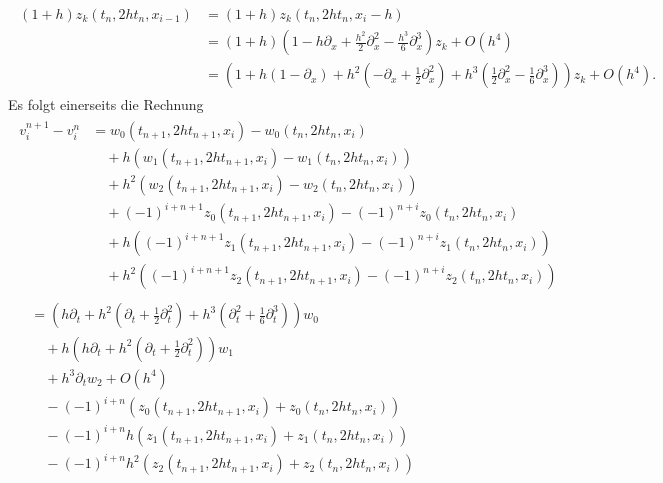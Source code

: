 {\small
\begin{align}
\begin{split}
(1 + h) z_k(t_n, 2 h t_n, x_{i-1}) &= (1+h) z_k(t_n, 2 h t_n, x_i - h)\\
&= (1 + h) \left( 1 - h \partial_x + \frac{h^2}{2} \partial^2_x - \frac {h^3}{6} \partial^3_x \right) z_k + O(h^4)\\
&= \left( 1 + h( 1 - \partial_x ) + h^2  \left( -\partial_x + \frac{1}{2} \partial^2_x \right) + h^3 \left(\frac{1}{2} \partial^2_x - \frac{1}{6} \partial^3_x \right) \right) z_k + O(h^4).
\end{split}
\end{align}
}
Es folgt einerseits die Rechnung
\begin{align}
\begin{split}
v^{n+1}_i - v^n_i &= w_0(t_{n+1}, 2 h t_{n+1}, x_i) - w_0(t_n, 2 h t_n, x_i)\\
&\quad + h \left(  w_1(t_{n+1}, 2 h t_{n+1}, x_i) - w_1(t_n, 2 h t_n, x_i) \right)\\
&\quad + h^2 \left(  w_2(t_{n+1}, 2 h t_{n+1}, x_i) - w_2(t_n, 2 h t_n, x_i) \right)\\
&\quad + (-1)^{i+n+1} z_0(t_{n+1}, 2 h t_{n+1}, x_i) - (-1)^{n+i} z_0(t_n, 2 h t_n, x_i)\\
&\quad + h \left( (-1)^{i+n+1} z_1(t_{n+1}, 2 h t_{n+1}, x_i) - (-1)^{n+i} z_1(t_n, 2 h t_n, x_i) \right)\\
&\quad + h^2 \left( (-1)^{i+n+1} z_2(t_{n+1}, 2 h t_{n+1}, x_i) - (-1)^{n+i} z_2(t_n, 2 h t_n, x_i) \right)
\end{split}\\
\begin{split}
&= \left( h \partial_t + h^2 \left( \partial_t + \frac{1}{2} \partial^2_t \right) + h^3 \left( \partial^2_t + \frac{1}{6} \partial^3_t \right) \right) w_0\\
&\quad + h \left(h \partial_t + h^2 \left( \partial_t + \frac{1}{2} \partial^2_t \right) \right) w_1\\
&\quad + h^3 \partial_t w_2 + O(h^4)\\
&\quad - (-1)^{i+n}     \left( z_0(t_{n+1}, 2 h t_{n+1}, x_i) + z_0(t_n, 2 h t_n, x_i) \right)\\
&\quad - (-1)^{i+n} h   \left( z_1(t_{n+1}, 2 h t_{n+1}, x_i) + z_1(t_n, 2 h t_n, x_i) \right)\\
&\quad - (-1)^{i+n} h^2 \left( z_2(t_{n+1}, 2 h t_{n+1}, x_i) + z_2(t_n, 2 h t_n, x_i) \right)
\end{split}\\

\end{align}
